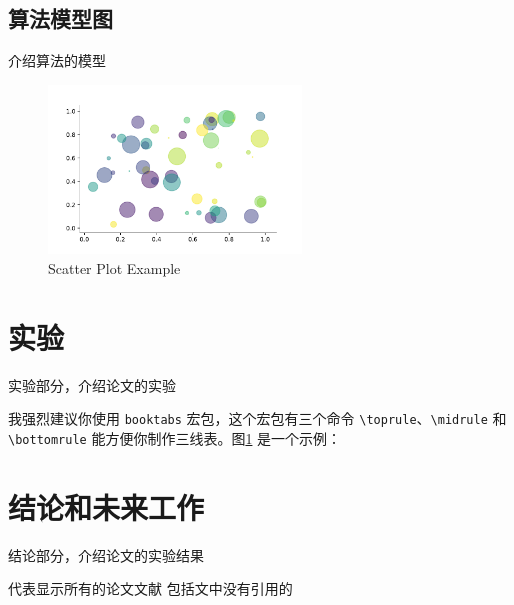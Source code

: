 \documentclass[lang=cn,11pt]{elegantpaper}
\begin{document}
\subsection{算法模型图}

介绍算法的模型

\begin{figure}[h]
	\centering
	\includegraphics[width=0.6\textwidth]{imgs/scatter.pdf}
	\caption{Scatter Plot Example \label{fig:scatter}}
\end{figure}


\section{实验}
实验部分，介绍论文的实验

我强烈建议你使用 \lstinline{booktabs} 宏包，这个宏包有三个命令 \lstinline{\toprule}、\lstinline{\midrule} 和 \lstinline{\bottomrule} 能方便你制作三线表。图\ref{fig:scatter} 是一个示例：



\section{结论和未来工作}
结论部分，介绍论文的实验结果

\nocite{*} 代表显示所有的论文文献 包括文中没有引用的



\end{document}
